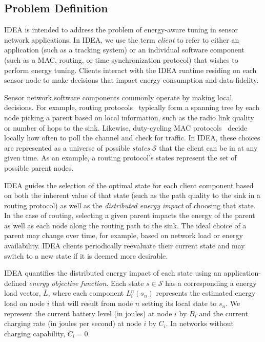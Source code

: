 \subsection{Problem Definition}

IDEA is intended to address the problem of energy-aware tuning in sensor
network applications. In IDEA, we use the term \textit{client} to refer to
either an application (such as a tracking system) or an individual software
component (such as a MAC, routing, or time synchronization protocol) that
wishes to perform energy tuning. Clients interact with the IDEA runtime
residing on each sensor node to make decisions that impact energy consumption
and data fidelity.

Sensor network software components commonly operate by making local
decisions. For example, routing protocols~\cite{ctp,awoo-multihop} typically
form a spanning tree by each node picking a parent based on local
information, such as the radio link quality or number of hops to the sink.
Likewise, duty-cycling MAC protocols~\cite{bmac-sensys04} decide locally how
often to poll the channel and check for traffic. In IDEA, these choices are
represented as a universe of possible \textit{states} $\mathcal{S}$ that the
client can be in at any given time. As an example, a routing protocol's
states represent the set of possible parent nodes.

IDEA guides the selection of the optimal state for each client component
based on both the inherent value of that state (such as the path quality to
the sink in a routing protocol) as well as the \textit{distributed energy
impact} of choosing that state. In the case of routing, selecting a given
parent impacts the energy of the parent as well as each node along the
routing path to the sink. The ideal choice of a parent may change over time,
for example, based on network load or energy availability. IDEA clients
periodically reevaluate their current state and may switch to a new state if
it is deemed more desirable.

IDEA quantifies the distributed energy impact of each state using an
application-defined \textit{energy objective function}. Each state $s \in
\mathcal{S}$ has a corresponding a energy load vector, $\bar{L}$, where each
component $L_i^n(s_n)$ represents the estimated energy load on node $i$ that
will result from node $n$ setting its local state to $s_n$. We represent the
current battery level (in joules) at node $i$ by $B_i$ and the current
charging rate (in joules per second) at node $i$ by $C_i$. In networks
without charging capability, $C_i = 0$.

